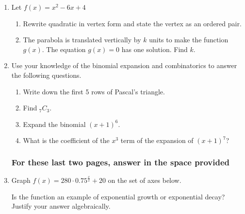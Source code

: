 \documentclass[12pt, oneside]{article}
\begin{document}
\begin{enumerate}
\item Let $f(x) = x^2-6x+4$
\begin{enumerate}
    \item Rewrite quadratic in vertex form and state the vertex as an ordered pair.
    \item The parabola is translated vertically by $k$ units to make the function $g(x)$. The equation $g(x)=0$ has one solution. Find $k$.
\end{enumerate}

\item Use your knowledge of the binomial expansion and combinatorics to answer the following questions.
\begin{enumerate}
    \item Write down the first 5 rows of Pascal's triangle.
    \item Find $_7C_3$.
    \item Expand the binomial $(x+1)^6$.
    \item What is the coefficient of the $x^3$ term of the expansion of $(x+1)^7$?
\end{enumerate}

\newpage
\subsubsection*{For these last two pages, answer in the space provided}

\item Graph $\displaystyle f(x)=280 \cdot 0.75^{\frac{x}{2}}+20$ on the set of axes below.
\begin{center}
\end{center} %
Is the function an example of exponential growth or exponential decay? Justify your answer algebraically.


\end{enumerate}
\end{document}
